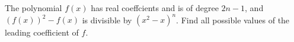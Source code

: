 \problem
The polynomial $f(x)$ has real coeffcients and is of degree $2 n - 1$, and
${(f(x))^2-f(x)}$ is divisible by ${(x^2-x)^n}$.
Find all possible values of the leading coefficient of $f$.
\solution
\endproblem
